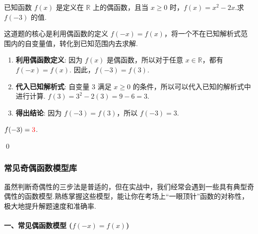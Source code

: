 \begin{exercise}
	已知函数 $f(x)$ 是定义在 $\mathbb{R}$ 上的偶函数，且当 $x \ge 0$ 时，$f(x) = x^2 - 2x$.求 $f(-3)$ 的值.
\end{exercise}
\begin{solution}
	\textcolor{green!50!black}{这道题的核心是利用偶函数的定义 $f(-x)=f(x)$，将一个不在已知解析式范围内的自变量值，转化到已知范围内去求解.}

	\begin{enumerate}
		\item \textbf{利用偶函数定义}:
		因为 $f(x)$ 是偶函数，所以对于任意 $x \in \mathbb{R}$，都有 $f(-x)=f(x)$.
		因此，$f(-3) = f(3)$.
		
		\item \textbf{代入已知解析式}:
		自变量 $3$ 满足 $x \ge 0$ 的条件，所以可以代入已知的解析式中进行计算.
		$f(3) = 3^2 - 2(3) = 9 - 6 = 3$.
		
		\item \textbf{得出结论}:
		因为 $f(-3)=f(3)$，所以 $f(-3)=3$.
	\end{enumerate}
	 $f(-3) = \textcolor{red}{3}$.
\end{solution}
\qed

\subsubsection*{常见奇偶函数模型库}
虽然判断奇偶性的三步法是普适的，但在实战中，我们经常会遇到一些具有典型奇偶性的函数模型.熟练掌握这些模型，能让你在考场上“一眼顶针”函数的对称性，极大地提升解题速度和准确率.

\paragraph{一、常见偶函数模型 ($f(-x) = f(x)$)}

